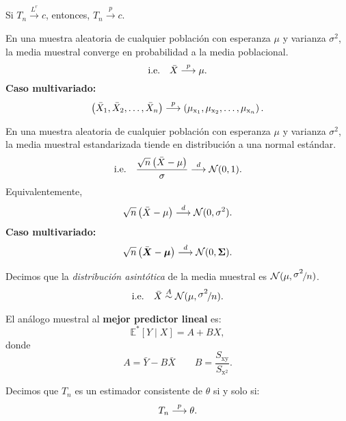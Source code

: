 \documentclass[8pt,a4paper]{extarticle}
\begin{document}
\begin{multicols}{3}
	\begin{boxcor}
		Si $T_n \overset{L^r}{\longrightarrow} c$, entonces, $T_n \overset{p}{\longrightarrow} c$.
	\end{boxcor}

	\begin{boxtheo}
		En una muestra aleatoria de cualquier población con esperanza $\mu$ y varianza $\sigma^2$, la media muestral converge en probabilidad a la media poblacional.
		\[\text{\normalfont i.e.} \quad \bar{X} \overset{p}{\longrightarrow} \mu.\]
		\textbf{Caso multivariado:}
		\[\left( \bar{X}_1, \bar{X}_2, \dots, \bar{X}_n \right) \overset{p}{\longrightarrow} \left( \mu_{\mathrm{x}_1}, \mu_{\mathrm{x}_2}, \dots, \mu_{\mathrm{x}_n} \right).\]
	\end{boxtheo}

	\begin{boxtheo}
		En una muestra aleatoria de cualquier población con esperanza $\mu$ y varianza $\sigma^2$, la media muestral estandarizada tiende en distribución a una normal estándar.
		\[\text{\normalfont i.e.} \quad \frac{\sqrt{n}\left( \bar{X} - \mu \right)}{\sigma} \overset{d}{\longrightarrow} \mathcal{N}(0,1).\]
		Equivalentemente,
		\[\sqrt{n}\left( \bar{X} - \mu \right) \overset{d}{\longrightarrow} \mathcal{N}(0,\sigma^2).\]
		\textbf{Caso multivariado:}
		\[\sqrt{n} \left( \bar{\bm X} - {\bm \mu} \right) \overset{d}{\longrightarrow} \mathcal{N}(0,{\bm \Sigma}) .\]
	\end{boxtheo}

	\begin{boxprop}
		Decimos que la \emph{distribución asintótica} de la media muestral es $\mathcal{N}(\mu,\nicefrac{\displaystyle\sigma^2}{\displaystyle n})$.
		\[\text{\normalfont i.e.} \quad \bar{X} \overset{A}{\sim} \mathcal{N}(\mu,\nicefrac{\displaystyle\sigma^2}{\displaystyle n}).\]
	\end{boxprop}

	\begin{boxprop}
		El análogo muestral al \textbf{mejor predictor lineal} es:
		\[
			\mathbb{E}^*\left[ Y  \mid X \right] = A + B X
			,\]
		donde
		\[
			A = \bar{Y} - B \bar{X} \qquad B = \frac{ S_{\mathrm{xy}} }{ S_{\mathrm{x}^2} }
			.\]
	\end{boxprop}

	\begin{boxdef}[Consistencia]
		Decimos que $T_n$ es un estimador consistente de $\theta$ si y solo si:
		\[T_n \overset{p}{\longrightarrow} \theta.\]
	\end{boxdef}

	\sectionbreak


\end{multicols}
\end{document}
